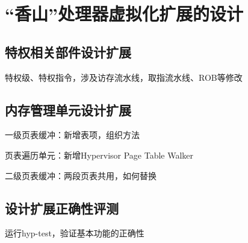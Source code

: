 \chapter{“香山”处理器虚拟化扩展的设计}

\section{特权相关部件设计扩展}
特权级、特权指令，涉及访存流水线，取指流水线、ROB等修改

\section{内存管理单元设计扩展}

一级页表缓冲：新增表项，组织方法

页表遍历单元：新增Hypervisor Page Table Walker

二级页表缓冲：两段页表共用，如何替换

\section{设计扩展正确性评测}

运行hyp-test，验证基本功能的正确性